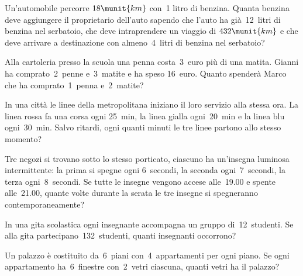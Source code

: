 \begin{htmulticols}{2}

\begin{esercizio}
Un'automobile percorre \(18\munit{km}\) con~1 litro di benzina. 
Quanta benzina deve aggiungere il proprietario dell'auto
sapendo che l'auto ha già~12~litri di benzina nel serbatoio, che deve 
intraprendere un viaggio di \(432\munit{km}\) e che deve
arrivare a destinazione con almeno~4~litri di benzina nel serbatoio? 
\end{esercizio}

\begin{esercizio}
Alla cartoleria presso la scuola una penna costa~3~euro più di una matita. 
Gianni ha comprato~2~penne e~3~matite e ha speso
16~euro. Quanto spenderà Marco che ha comprato~1~penna e~2~matite? 
 \sol{9\meuro}
\end{esercizio}

\begin{esercizio}
In una città le linee della metropolitana iniziano il loro servizio alla 
stessa 
ora. La linea rossa fa una corsa ogni 25~min, la linea gialla ogni~20~min 
e la linea blu ogni~30~min. Salvo ritardi, ogni quanti minuti le tre linee
partono allo stesso momento? 
\end{esercizio}

\begin{esercizio}
 Tre negozi si trovano sotto lo stesso porticato, ciascuno ha un'insegna 
luminosa intermittente: la prima si spegne ogni
6~secondi, la seconda ogni~7~secondi, la terza ogni~8~secondi. Se tutte le 
insegne vengono accese alle~19.00 e spente alle~21.00, quante 
volte durante la serata le tre insegne si spegneranno contemporaneamente?
\end{esercizio}

\begin{esercizio}
In una gita scolastica ogni insegnante accompagna un gruppo di~12~studenti. 
Se alla gita partecipano~132~studenti, quanti insegnanti occorrono?
\end{esercizio}

\begin{esercizio}
Un palazzo è costituito da~6~piani con~4~appartamenti per ogni piano. 
Se ogni appartamento ha~6~finestre con~2~vetri ciascuna, 
quanti vetri ha il palazzo?
\end{esercizio}


\end{htmulticols}
